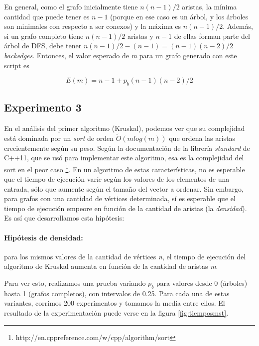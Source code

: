 \documentclass[a4paper]{report}
\begin{document}
En general, como el grafo inicialmente tiene $n (n-1) / 2$ aristas, la mínima cantidad que puede tener es $n-1$ (porque en ese caso es un árbol, y los árboles son minimales con respecto a ser conexos) y la máxima es $n (n-1) / 2$. Además, si un grafo completo tiene $n (n-1) / 2$ aristas y $n-1$ de ellas forman parte del árbol de DFS, debe tener $n (n-1) / 2 - (n-1) = (n-1) (n-2) / 2$ \textit{backedges}. Entonces, el valor esperado de \textit{m} para un grafo generado con este script es

$$
E(m) = n-1 + p_{b} (n-1) (n-2) / 2
$$

\subsection{Experimento 3}

En el análisis del primer algoritmo (Kruskal), podemos ver que su complejidad está dominada por un \textit{sort} de orden $\tilde{O}(m log(m))$ que ordena las aristas crecientemente según su peso. Según la documentación de la librería \textit{standard} de C++11, que se usó para implementar este algoritmo, esa es la complejidad del sort en el peor caso \footnote{http://en.cppreference.com/w/cpp/algorithm/sort}. En un algoritmo de estas características, no es esperable que el tiempo de ejecución varíe según los valores de los elementos de una entrada, sólo que aumente según el tamaño del vector a ordenar. Sin embargo, para grafos con una cantidad de vértices determinada, sí es esperable que el tiempo de ejecución empeore en función de la cantidad de aristas (la \textit{densidad}). Es así que desarrollamos esta hipótesis:

\paragraph{Hipótesis de densidad: } para los mismos valores de la cantidad de vértices \textit{n}, el tiempo de ejecución del algoritmo de Kruskal aumenta en función de la cantidad de aristas \textit{m}.

Para ver esto, realizamos una prueba variando $p_{b}$ para valores desde 0 (árboles) hasta 1 (grafos completos), con intervalos de 0.25. Para cada una de estas variantes, corrimos 200 experimentos y tomamos la media entre ellos. El resultado de la experimentación puede verse en la figura \ref{fig:tiemposmst}.
\end{document}

